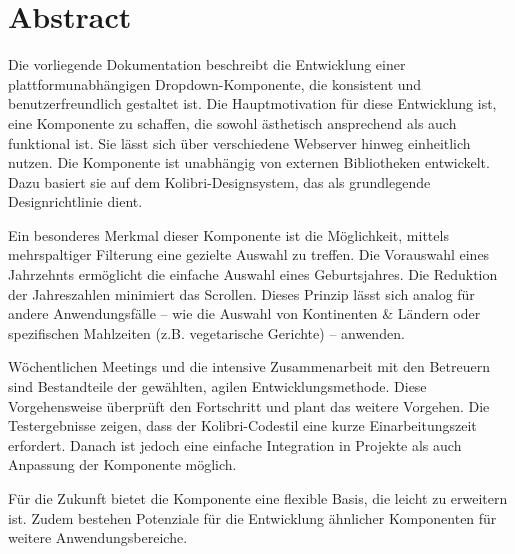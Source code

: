 \chapter*{Abstract}

Die vorliegende Dokumentation beschreibt die Entwicklung einer plattformunabhängigen Dropdown-Komponente, die konsistent und benutzerfreundlich gestaltet ist. 
Die Hauptmotivation für diese Entwicklung ist, eine Komponente zu schaffen, die sowohl ästhetisch ansprechend als auch funktional ist. 
Sie lässt sich über verschiedene Webserver hinweg einheitlich nutzen. 
Die Komponente ist unabhängig von externen Bibliotheken entwickelt. 
Dazu basiert sie auf dem Kolibri-Designsystem, das als grundlegende Designrichtlinie dient. 

Ein besonderes Merkmal dieser Komponente ist die Möglichkeit, mittels mehrspaltiger Filterung eine gezielte Auswahl zu treffen. 
Die Vorauswahl eines Jahrzehnts ermöglicht die einfache Auswahl eines Geburtsjahres. 
Die Reduktion der Jahreszahlen minimiert das Scrollen. 
Dieses Prinzip lässt sich analog für andere Anwendungsfälle – wie die Auswahl von Kontinenten \& Ländern oder spezifischen Mahlzeiten (z.B. vegetarische Gerichte) – anwenden. 

Wöchentlichen Meetings und die intensive Zusammenarbeit mit den Betreuern sind Bestandteile der gewählten, agilen Entwicklungsmethode. 
Diese Vorgehensweise überprüft den Fortschritt und plant das weitere Vorgehen. 
Die Testergebnisse zeigen, dass der Kolibri-Codestil eine kurze Einarbeitungszeit erfordert. 
Danach ist jedoch eine einfache Integration in Projekte als auch Anpassung der Komponente möglich. 

Für die Zukunft bietet die Komponente eine flexible Basis, die leicht zu erweitern ist. 
Zudem bestehen Potenziale für die Entwicklung ähnlicher Komponenten für weitere Anwendungsbereiche. 
